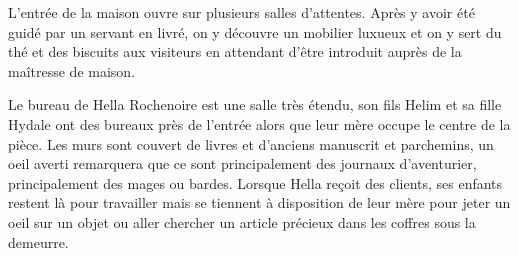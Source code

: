 L'entrée de la maison ouvre sur plusieurs salles d'attentes. Après y avoir
été guidé par un servant en livré, on y découvre un mobilier luxueux et on 
y sert du thé et des biscuits aux visiteurs en attendant d'être introduit
auprès de la maîtresse de maison.

Le bureau de Hella Rochenoire est une salle très étendu, son fils Helim 
et sa fille Hydale ont des bureaux près de l'entrée alors que leur mère 
occupe le centre de la pièce. Les murs sont couvert de livres et d'anciens 
manuscrit et parchemins, un oeil averti remarquera que ce sont principalement 
des journaux d'aventurier, principalement des mages ou bardes. Lorsque Hella 
reçoit des clients, ses enfants restent là pour travailler mais se tiennent 
à disposition de leur mère pour jeter un oeil sur un objet ou aller chercher 
un article précieux dans les coffres sous la demeurre.

